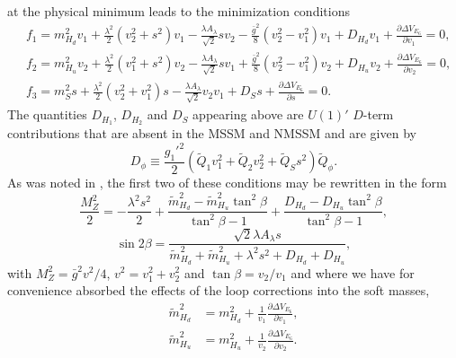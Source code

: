 \documentclass[preprint,amsmath,amssymb,aps,superscriptaddress,prd,showpacs,floatfix]{revtex4-1}
\begin{document}
at the physical minimum leads to the minimization conditions
\begin{subequations}\label{eq:E6EWSBConditions}
\begin{align}
&f_1=m_{H_d}^2v_1+\frac{\lambda^2}{2}(v_2^2+s^2)v_1-\frac{\lambda A_\lambda}{\sqrt{2}}sv_2-\frac{\bar{g}^2}{8}
(v_2^2-v_1^2)v_1+D_{H_d}v_1+\frac{\partial \Delta V_{E_6}}{\partial v_1}=0,\label{eq:E6EWSBcondition1} \\
&f_2=m_{H_u}^2v_2+\frac{\lambda^2}{2}(v_1^2+s^2)v_2-\frac{\lambda A_\lambda}{\sqrt{2}}sv_1+\frac{\bar{g}^2}{8}
(v_2^2-v_1^2)v_2+D_{H_u}v_2+\frac{\partial \Delta V_{E_6}}{\partial v_2}=0,\label{eq:E6EWSBcondition2} \\
&f_3=m_S^2s+\frac{\lambda^2}{2}(v_2^2+v_1^2)s-\frac{\lambda A_\lambda}{\sqrt{2}}v_2v_1+D_Ss+\frac{\partial \Delta V_{E_6}}{\partial s}=0.\label{eq:E6EWSBcondition3}
\end{align}
\end{subequations}
The quantities $D_{H_1}$, $D_{H_2}$ and $D_S$ appearing above are $U(1)'$ $D$-term contributions that are absent in the MSSM and NMSSM and are given by
\begin{equation}\label{eq:E6Dterms}
D_\phi\equiv \frac{g_1'^2}{2}\left ( \tilde{Q}_1v_1^2+\tilde{Q}_2v_2^2+\tilde{Q}_Ss^2\right )\tilde{Q}_\phi.
\end{equation}
As was noted in \cite{Athron:2013ipa}, the first two of these conditions may be rewritten in the form
\begin{equation}\label{eq:E6MZequation}
\frac{M_Z^2}{2}=-\frac{\lambda^2s^2}{2}+\frac{\tilde{m}_{H_d}^2-\tilde{m}_{H_u}^2\tan^2\beta}{\tan^2\beta-1}+\frac{D_{H_d}-D_{H_u}\tan^2\beta}{\tan^2\beta-1},
\end{equation}
\begin{equation}\label{eq:E6sin2bequation}
\sin 2\beta=\frac{\sqrt{2}\lambda A_{\lambda} s}{\tilde{m}_{H_d}^2+\tilde{m}_{H_u}^2+\lambda^2s^2+D_{H_d}+D_{H_u}},
\end{equation}
with $M_Z^2=\bar{g}^2v^2/4$, $v^2=v_1^2+v_2^2$ and $\tan\beta = v_2/v_1$ and where we have for convenience absorbed the effects of the loop corrections into the soft masses, 
\begin{align*}
\tilde{m}_{H_d}^2&=m_{H_d}^2+\frac{1}{v_1}\frac{\partial \Delta V_{E_6}}{\partial v_1},\\
\tilde{m}_{H_u}^2&=m_{H_u}^2+\frac{1}{v_2}\frac{\partial \Delta V_{E_6}}{\partial v_2}.
\end{align*}
\end{document}
